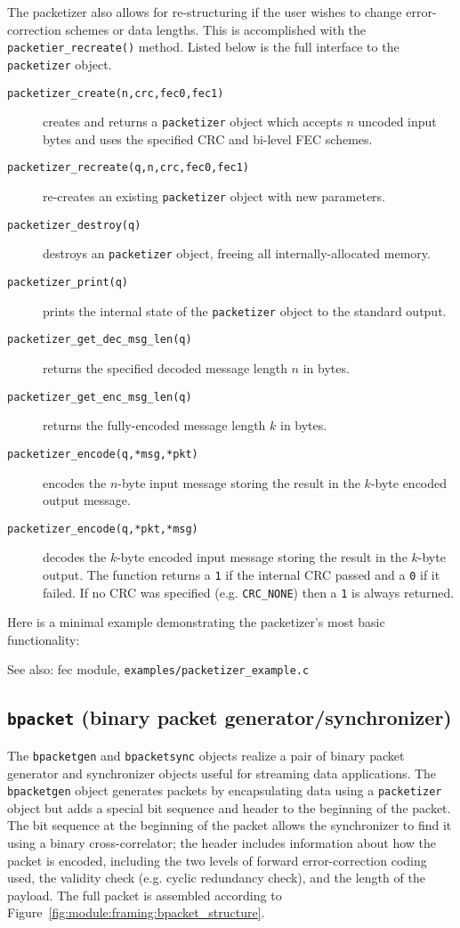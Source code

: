 The packetizer also allows for re-structuring if the user wishes to change
error-correction schemes or data lengths.  This is accomplished with the
{\tt packetier\_recreate()} method.
Listed below is the full interface to the {\tt packetizer} object.
%
\begin{description}
\item[{\tt packetizer\_create(n,crc,fec0,fec1)}]
    creates and returns a {\tt packetizer} object which accepts $n$
    uncoded input bytes and uses the specified CRC and bi-level FEC
    schemes.
\item[{\tt packetizer\_recreate(q,n,crc,fec0,fec1)}]
    re-creates an existing {\tt packetizer} object with new parameters.
\item[{\tt packetizer\_destroy(q)}]
    destroys an {\tt packetizer} object, freeing all
    internally-allocated memory.
\item[{\tt packetizer\_print(q)}]
    prints the internal state of the {\tt packetizer} object to the
    standard output.
\item[{\tt packetizer\_get\_dec\_msg\_len(q)}]
    returns the specified decoded message length $n$ in bytes.
\item[{\tt packetizer\_get\_enc\_msg\_len(q)}]
    returns the fully-encoded message length $k$ in bytes.
\item[{\tt packetizer\_encode(q,*msg,*pkt)}]
    encodes the $n$-byte input message storing the result in the
    $k$-byte encoded output message.
\item[{\tt packetizer\_encode(q,*pkt,*msg)}]
    decodes the $k$-byte encoded input message storing the result in the
    $k$-byte output.
    The function returns a {\tt 1} if the internal CRC passed
    and a {\tt 0} if it failed.
    If no CRC was specified (e.g. {\tt CRC\_NONE}) then a {\tt 1} is
    always returned.
\end{description}
%
Here is a minimal example demonstrating the packetizer's most basic
functionality:
%

%
See also: fec module, {\tt examples/packetizer\_example.c}


%
%
\subsection{{\tt bpacket} (binary packet generator/synchronizer)}
\label{module:framing:bpacket}
The {\tt bpacketgen} and {\tt bpacketsync} objects realize a pair of
binary packet generator and synchronizer objects useful for streaming
data applications.
The {\tt bpacketgen} object generates packets by encapsulating data
using a {\tt packetizer} object but adds a special bit sequence and
header to the beginning of the packet.
The bit sequence at the beginning of the packet allows the synchronizer
to find it using a binary cross-correlator;
the header includes information about how the packet is encoded,
including the two levels of forward error-correction coding used, the
validity check (e.g. cyclic redundancy check), and the length of the
payload.
The full packet is assembled according to
Figure~\ref{fig:module:framing:bpacket_structure}.

